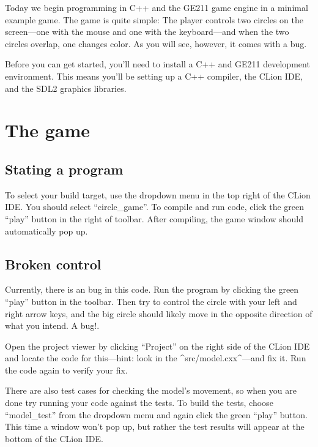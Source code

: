 \documentclass{tufte-handout}
\begin{document}
\maketitle

Today we begin programming in C++ and the GE211 game engine in a minimal
example game. The game is quite simple: The player controls two circles
on the screen---one with the mouse and one with the keyboard---and when
the two circles overlap, one changes color. As you will see, however, it
comes with a bug.

Before you can get started, you’ll need to install a C++ and GE211
development environment. This means you’ll be setting up
a C++ compiler,
the CLion IDE, and the SDL2 graphics libraries.

\CxxPrelims*

\section{The game}

\subsection{Stating a program}

To select your build target, use the dropdown menu in the top right of the
CLion IDE. You should select ``circle_game''. To compile and run code, click
the green ``play'' button in the right of toolbar. After compiling, the game
window should automatically pop up.

\subsection{Broken control}

Currently, there is an bug in this code. Run the program by clicking the
green “play” button in the toolbar. Then try to control the circle with
your left and right arrow keys, and the big circle should likely move
in the opposite direction of what you intend. A bug!.

Open the project viewer by clicking ``Project'' on the right side of the CLion
IDE and locate the code for this---hint: look in the ^src/model.cxx^---and fix
it. Run the code again to verify your fix.

There are also test cases for checking the model's movement, so when you are
done try running your code against the tests. To build the tests, choose
``model_test'' from the dropdown menu and again click the green ``play''
button. This time a window won't pop up, but rather the test results will
appear at the bottom of the CLion IDE.
\end{document}
